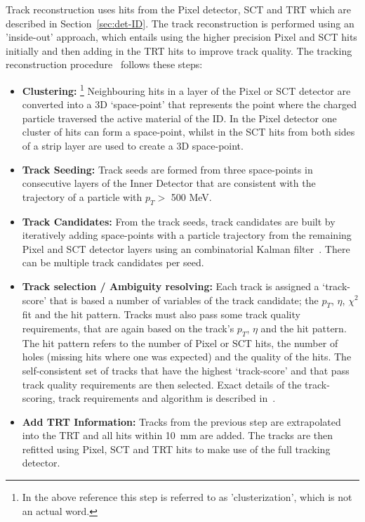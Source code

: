 Track reconstruction uses hits from the Pixel detector, SCT and TRT which are described in Section~\ref{sec:det-ID}.
The track reconstruction is performed using an 'inside-out' approach,
which entails using the higher precision Pixel and SCT hits initially
and then adding in the TRT hits to improve track quality.
The tracking reconstruction procedure~\cite{obj-tracks_TIDE} follows these steps:
\vspace{-0.5em}
\begin{itemize}[leftmargin=*]
\item\textbf{Clustering:}
  \footnote{In the above reference this step is referred to as 'clusterization', which is not an actual word.}
  Neighbouring hits in a layer of the Pixel or SCT detector are converted into a 3D `space-point'
  that represents the point where the charged particle traversed the active material of the ID.
  In the Pixel detector one cluster of hits can form a space-point,
  whilst in the SCT hits from both sides of a strip layer are used to create a 3D space-point.\vspace{0.5em}
\item\textbf{Track Seeding:}
  Track seeds are formed from three space-points in consecutive layers of the Inner Detector
  that are consistent with the trajectory of a particle with $p_T >$ 500 MeV.\vspace{0.5em}
\item\textbf{Track Candidates:}
  From the track seeds, track candidates are built by iteratively adding space-points with a particle trajectory
  from the remaining Pixel and SCT detector layers using an combinatorial Kalman filter~\cite{obj-tracks_kal}.
  There can be multiple track candidates per seed.\vspace{0.5em}
\item\textbf{Track selection / Ambiguity resolving:}
  Each track is assigned a `track-score' that is based a number of variables of the track candidate;
  the $p_T$, $\eta$, $\chi^{2}$ fit and the hit pattern.
  Tracks must also pass some track quality requirements, that are again based on the track's $p_T$, $\eta$ and the hit pattern.
  The hit pattern refers to the number of Pixel or SCT hits,
  the number of holes (missing hits where one was expected)
  and the quality of the hits.
  The self-consistent set of tracks that have the highest `track-score' and that pass track quality requirements are then selected.
  Exact details of the track-scoring, track requirements and algorithm is described in~\cite{obj-tracks_TIDE}.\vspace{0.5em}
\item\textbf{Add TRT Information:}
  Tracks from the previous step are extrapolated into the TRT and all hits within \SI{10}{\milli\metre} are added.
  The tracks are then refitted using Pixel, SCT and TRT hits to make use of the full tracking detector.
\end{itemize}

